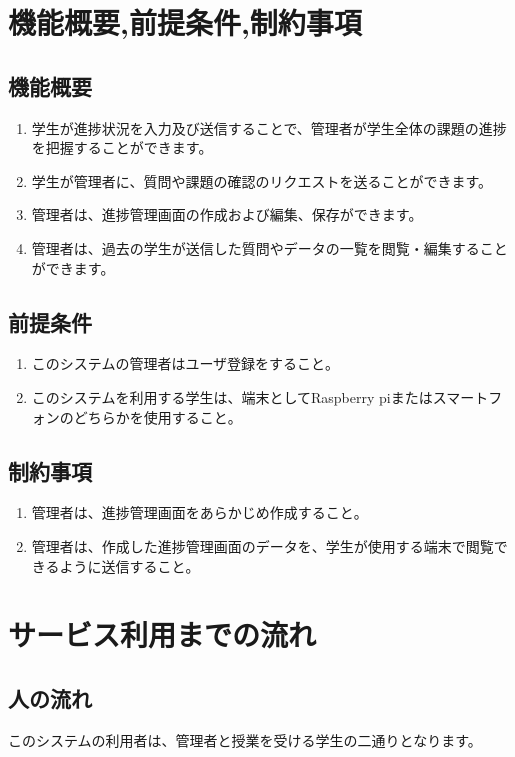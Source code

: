 \documentclass[a4j,titlepage]{ujarticle}
\begin{document}
\section{機能概要,前提条件,制約事項}

\subsection{機能概要}
\begin{enumerate}[(1)]
\item 学生が進捗状況を入力及び送信することで、管理者が学生全体の課題の進捗を把握することができます。
\item 学生が管理者に、質問や課題の確認のリクエストを送ることができます。
\item 管理者は、進捗管理画面の作成および編集、保存ができます。
\item 管理者は、過去の学生が送信した質問やデータの一覧を閲覧・編集することができます。　
\end{enumerate}

\subsection{前提条件}
\begin{enumerate}[(1)]
\item このシステムの管理者はユーザ登録をすること。
\item このシステムを利用する学生は、端末としてRaspberry piまたはスマートフォンのどちらかを使用すること。
\end{enumerate}

\subsection{制約事項}
\begin{enumerate}[(1)]
\item 管理者は、進捗管理画面をあらかじめ作成すること。
\item 管理者は、作成した進捗管理画面のデータを、学生が使用する端末で閲覧できるように送信すること。
\end{enumerate}

\section{サービス利用までの流れ}
\subsection{人の流れ}
このシステムの利用者は、管理者と授業を受ける学生の二通りとなります。
\end{document}
